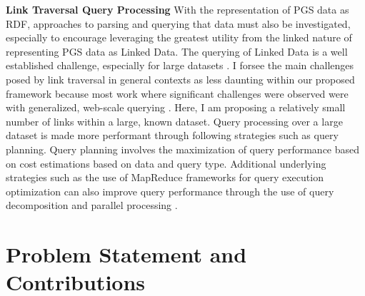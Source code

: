 \documentclass[runningheads]{llncs}
\begin{document}
\textbf{Link Traversal Query Processing}
With the representation of PGS data as RDF, approaches to parsing and querying that data must also be investigated, especially to encourage leveraging the greatest utility from the linked nature of representing PGS data as Linked Data.
The querying of Linked Data is a well established challenge, especially for large  datasets \cite{taelman_evaluation_2023}.
I forsee the main challenges posed by link traversal in general contexts as less daunting within our proposed framework because most work where significant challenges were observed were with generalized, web-scale querying \cite{taelman_evaluation_2023}. 
Here, I am proposing a relatively small number of links within a large, known dataset. 
Query processing over a large dataset is made more performant through following strategies such as query planning.
Query planning involves the maximization of query performance based on cost estimations based on data and query type. 
Additional underlying strategies such as the use of MapReduce frameworks for query execution optimization can also improve query performance through the use of query decomposition and parallel processing \cite{shim_mapreduce_2013}.  


\section{Problem Statement and Contributions}

\end{document}
